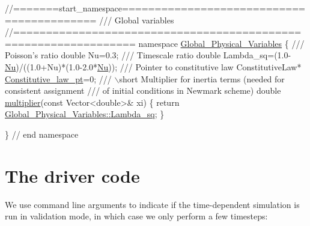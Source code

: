  
\begin{DoxyCodeInclude}
\textcolor{comment}{//=======start\_namespace==========================================}
\textcolor{comment}{/// Global variables}
\textcolor{comment}{}\textcolor{comment}{//================================================================}
\textcolor{keyword}{namespace }\hyperlink{namespaceGlobal__Physical__Variables}{Global\_Physical\_Variables}
\{\textcolor{comment}{}
\textcolor{comment}{ /// Poisson's ratio}
\textcolor{comment}{} \textcolor{keywordtype}{double} Nu=0.3;
\textcolor{comment}{}
\textcolor{comment}{ /// Timescale ratio }
\textcolor{comment}{} \textcolor{keywordtype}{double} Lambda\_sq=(1.0-\hyperlink{namespaceGlobal__Physical__Variables_a3962c36313826b19f216f6bbbdd6a477}{Nu})/((1.0+Nu)*(1.0-2.0*\hyperlink{namespaceGlobal__Physical__Variables_a3962c36313826b19f216f6bbbdd6a477}{Nu}));
 \textcolor{comment}{}
\textcolor{comment}{ /// Pointer to constitutive law}
\textcolor{comment}{} ConstitutiveLaw* \hyperlink{namespaceGlobal__Physical__Variables_a2a37fb040c832ee7a086bb13bb02a100}{Constitutive\_law\_pt}=0;
\textcolor{comment}{}
\textcolor{comment}{ /// \(\backslash\)short Multiplier for inertia terms (needed for consistent assignment }
\textcolor{comment}{ /// of initial conditions in Newmark scheme)}
\textcolor{comment}{} \textcolor{keywordtype}{double} \hyperlink{namespaceGlobal__Physical__Variables_a01099bce3441c7fe79ac6926800097a8}{multiplier}(\textcolor{keyword}{const} Vector<double>& xi)
 \{
  \textcolor{keywordflow}{return} \hyperlink{namespaceGlobal__Physical__Variables_a6fe17557ceb32dd353827fba60408363}{Global\_Physical\_Variables::Lambda\_sq};
 \}


\} \textcolor{comment}{// end namespace}

\end{DoxyCodeInclude}




 

\hypertarget{index_main}{}\section{The driver code}\label{index_main}
We use command line arguments to indicate if the time-\/dependent simulation is run in validation mode, in which case we only perform a few timesteps\+:

